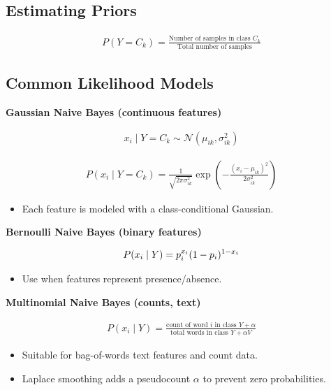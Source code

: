 \documentclass[10pt,a4paper]{article}
\begin{document}
		\subsection{Estimating Priors}
		\begin{align*}
			P(Y=C_k)=\frac{\text{Number of samples in class } C_k}{\text{Total number of samples}}
		\end{align*}
	
		\subsection{Common Likelihood Models}
		\textbf{Gaussian Naive Bayes (continuous features)}
	
		\begin{align*}
			x_i \mid Y=C_k \sim \mathcal{N}(\mu_{ik}, \sigma_{ik}^2)
		\end{align*}
	
		\begin{align*}
			P(x_i \mid Y=C_k)=\frac{1}{\sqrt{2\pi\sigma_{ik}^2}}\exp\!\left(-\frac{(x_i-\mu_{ik})^2}{2\sigma_{ik}^2}\right)
		\end{align*}
	
		\begin{itemize}
			\item Each feature is modeled with a class-conditional Gaussian.
		\end{itemize}
	
		\textbf{Bernoulli Naive Bayes (binary features)}
	
		\begin{align*}
			\Large P(x_i \mid Y)=p_i^{x_i}(1-p_i)^{1-x_i}
		\end{align*}
	
		\begin{itemize}
			\item Use when features represent presence/absence.
		\end{itemize}
	
		\textbf{Multinomial Naive Bayes (counts, text)}
	
		\begin{align*}
			P(x_i \mid Y)=\frac{\text{count of word } i \text{ in class } Y + \alpha}{\text{total words in class } Y + \alpha V}
		\end{align*}
	
		\begin{itemize}
			\item Suitable for bag-of-words text features and count data.
			\item Laplace smoothing adds a pseudocount $\alpha$ to prevent zero probabilities.
		\end{itemize}
	
\end{document}
